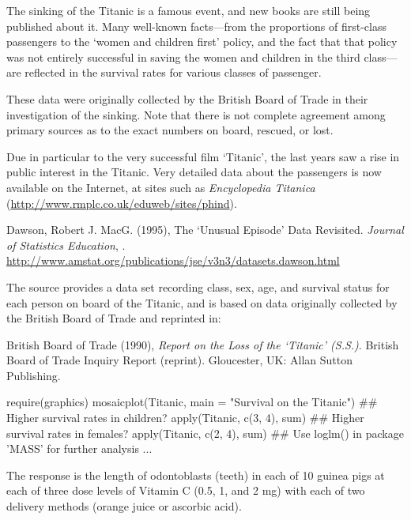 %
\begin{Details}\relax
The sinking of the Titanic is a famous event, and new books are still
being published about it.  Many well-known facts---from the
proportions of first-class passengers to the `women and
children first' policy, and the fact that that policy was not
entirely successful in saving the women and children in the third
class---are reflected in the survival rates for various classes of
passenger.

These data were originally collected by the British Board of Trade in
their investigation of the sinking.  Note that there is not complete
agreement among primary sources as to the exact numbers on board,
rescued, or lost.

Due in particular to the very successful film `Titanic', the last
years saw a rise in public interest in the Titanic.  Very detailed
data about the passengers is now available on the Internet, at sites
such as \emph{Encyclopedia Titanica}
(\url{http://www.rmplc.co.uk/eduweb/sites/phind}).
\end{Details}
%
\begin{Source}\relax
Dawson, Robert J. MacG. (1995),
The `Unusual Episode' Data Revisited.
\emph{Journal of Statistics Education}, .
\url{http://www.amstat.org/publications/jse/v3n3/datasets.dawson.html}

The source provides a data set recording class, sex, age, and survival
status for each person on board of the Titanic, and is based on data
originally collected by the British Board of Trade and reprinted in:

British Board of Trade (1990),
\emph{Report on the Loss of the `Titanic' (S.S.)}.
British Board of Trade Inquiry Report (reprint).
Gloucester, UK: Allan Sutton Publishing.
\end{Source}
%
\begin{Examples}
\begin{ExampleCode}
require(graphics)
mosaicplot(Titanic, main = "Survival on the Titanic")
## Higher survival rates in children?
apply(Titanic, c(3, 4), sum)
## Higher survival rates in females?
apply(Titanic, c(2, 4), sum)
## Use loglm() in package 'MASS' for further analysis ...
\end{ExampleCode}
\end{Examples}
%
\begin{Description}\relax
The response is the length of odontoblasts (teeth) in each of 10
guinea pigs at each of three dose levels of Vitamin C (0.5, 1, and 2
mg) with each of two delivery methods (orange juice or ascorbic
acid).
\end{Description}
